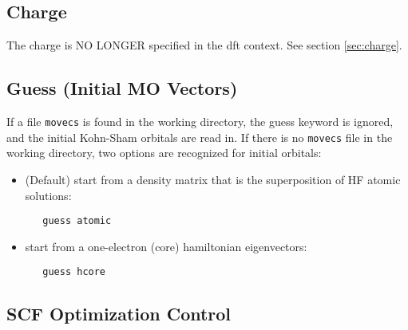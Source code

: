 \subsection{Charge}

The charge is NO LONGER specified in the dft context.  See section 
\ref{sec:charge}.

\subsection{Guess (Initial MO Vectors)}

If a file {\tt movecs} is found in the working directory, the 
guess keyword is ignored, and the initial Kohn-Sham orbitals are read in.
If there is no {\tt movecs} file in the working directory,
two options are recognized for initial orbitals:
\begin{itemize}
\item (Default) start from a density matrix that is the superposition of HF
  atomic solutions:
\begin{verbatim}
   guess atomic
\end{verbatim}
\item start from a one-electron (core) hamiltonian eigenvectors:
\begin{verbatim}
   guess hcore
\end{verbatim}
\end{itemize}

\subsection{SCF Optimization Control}

